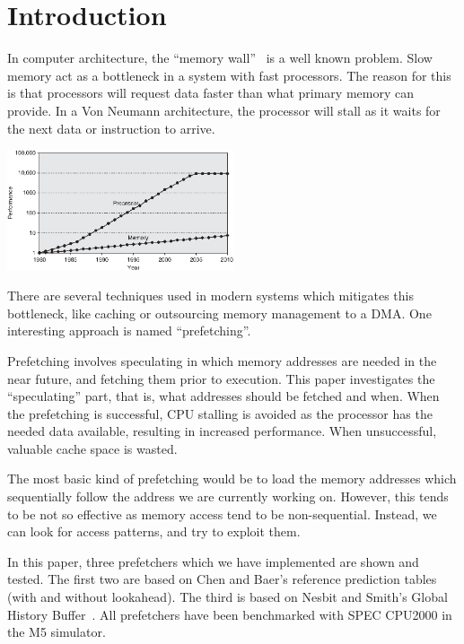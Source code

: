 \section{Introduction} %


In computer architecture, the ``memory wall''~\cite{wulf_mckee_1995}
is a well known problem. Slow memory act as a bottleneck in a system
with fast processors. The reason for this is that processors will
request data faster than what primary memory can provide. In a Von
Neumann architecture, the processor
will stall as it waits for the next data or instruction to arrive.

\begin{center}
  \includegraphics[width=0.5\textwidth]{graphs/memorywall}
\end{center}

There are several techniques used in modern systems which mitigates
this bottleneck, like caching or outsourcing memory management to a
DMA. One interesting approach is named ``prefetching''.

Prefetching involves speculating in which memory addresses are needed
in the near future, and fetching them prior to execution. This paper
investigates the ``speculating'' part, that is, what addresses should
be fetched and when. When the prefetching is successful, CPU stalling
is avoided as the processor has the needed data available, resulting
in increased performance. When unsuccessful, valuable cache space is
wasted.

The most basic kind of prefetching would be to load the memory
addresses which sequentially follow the address we are currently
working on. However, this tends to be not so effective as memory
access tend to be non-sequential. Instead, we can look for access
patterns, and try to exploit them.

In this paper, three prefetchers which we have implemented are shown
and tested. The first two are based on Chen and Baer's reference
prediction tables~\cite{chen_baer_1995} (with and without
lookahead). The third is based on Nesbit and Smith's Global History
Buffer~\cite{nesbit_smith_2005}. All prefetchers have been benchmarked
with SPEC CPU2000 in the M5 simulator.

